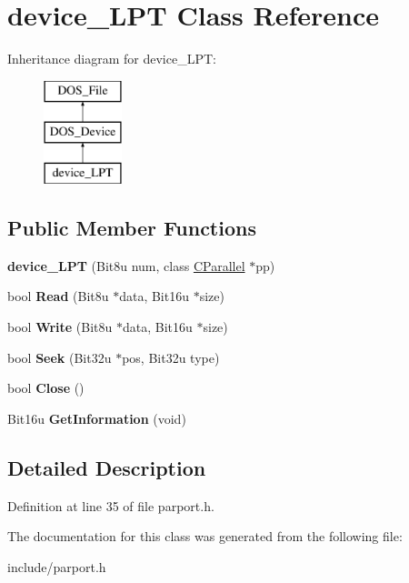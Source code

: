 \hypertarget{classdevice__LPT}{\section{device\-\_\-\-L\-P\-T Class Reference}
\label{classdevice__LPT}
}
Inheritance diagram for device\-\_\-\-L\-P\-T\-:\begin{figure}[H]
\begin{center}
\leavevmode
\includegraphics[height=3.000000cm]{classdevice__LPT}
\end{center}
\end{figure}
\subsection*{Public Member Functions}
\begin{DoxyCompactItemize}
\item 
\hypertarget{classdevice__LPT_a0fe0f1dcd98ebcc2d1338989f6cd8ce2}{{\bfseries device\-\_\-\-L\-P\-T} (Bit8u num, class \hyperlink{classCParallel}{C\-Parallel} $\ast$pp)}\label{classdevice__LPT_a0fe0f1dcd98ebcc2d1338989f6cd8ce2}

\item 
\hypertarget{classdevice__LPT_accdd4209aa20091bac0e7421b8bede4a}{bool {\bfseries Read} (Bit8u $\ast$data, Bit16u $\ast$size)}\label{classdevice__LPT_accdd4209aa20091bac0e7421b8bede4a}

\item 
\hypertarget{classdevice__LPT_a71e6f560b6d2b9569a204adedf342bda}{bool {\bfseries Write} (Bit8u $\ast$data, Bit16u $\ast$size)}\label{classdevice__LPT_a71e6f560b6d2b9569a204adedf342bda}

\item 
\hypertarget{classdevice__LPT_abe09b700e40219a83df6970a4736646c}{bool {\bfseries Seek} (Bit32u $\ast$pos, Bit32u type)}\label{classdevice__LPT_abe09b700e40219a83df6970a4736646c}

\item 
\hypertarget{classdevice__LPT_a4b2fcab25e3e3b0a40e5ad7b4285147e}{bool {\bfseries Close} ()}\label{classdevice__LPT_a4b2fcab25e3e3b0a40e5ad7b4285147e}

\item 
\hypertarget{classdevice__LPT_a6ff3740aaab3006b025cc06bef4163fe}{Bit16u {\bfseries Get\-Information} (void)}\label{classdevice__LPT_a6ff3740aaab3006b025cc06bef4163fe}

\end{DoxyCompactItemize}


\subsection{Detailed Description}


Definition at line 35 of file parport.\-h.



The documentation for this class was generated from the following file\-:\begin{DoxyCompactItemize}
\item 
include/parport.\-h\end{DoxyCompactItemize}
